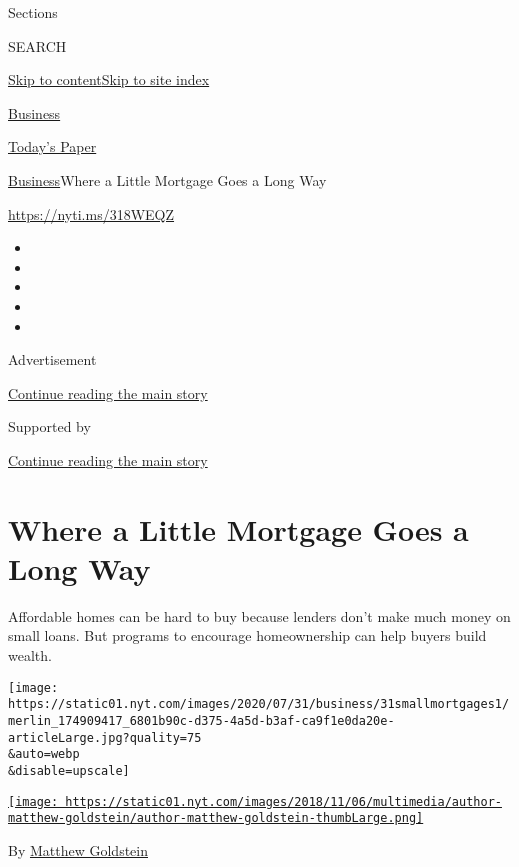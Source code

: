 Sections

SEARCH

\protect\hyperlink{site-content}{Skip to
content}\protect\hyperlink{site-index}{Skip to site index}

\href{https://www.nytimes.com/section/business}{Business}

\href{https://myaccount.nytimes.com/auth/login?response_type=cookie\&client_id=vi}{}

\href{https://www.nytimes.com/section/todayspaper}{Today's Paper}

\href{/section/business}{Business}\textbar{}Where a Little Mortgage Goes
a Long Way

\url{https://nyti.ms/318WEQZ}

\begin{itemize}
\item
\item
\item
\item
\item
\end{itemize}

Advertisement

\protect\hyperlink{after-top}{Continue reading the main story}

Supported by

\protect\hyperlink{after-sponsor}{Continue reading the main story}

\hypertarget{where-a-little-mortgage-goes-a-long-way}{%
\section{Where a Little Mortgage Goes a Long
Way}\label{where-a-little-mortgage-goes-a-long-way}}

Affordable homes can be hard to buy because lenders don't make much
money on small loans. But programs to encourage homeownership can help
buyers build wealth.

\texttt{[image: https://static01.nyt.com/images/2020/07/31/business/31smallmortgages1/merlin\_174909417\_6801b90c-d375-4a5d-b3af-ca9f1e0da20e-articleLarge.jpg?quality=75\\\&auto=webp\\\&disable=upscale]}

\href{https://www.nytimes.com/by/matthew-goldstein}{\texttt{[image: https://static01.nyt.com/images/2018/11/06/multimedia/author-matthew-goldstein/author-matthew-goldstein-thumbLarge.png]}}

By \href{https://www.nytimes.com/by/matthew-goldstein}{Matthew
Goldstein}

